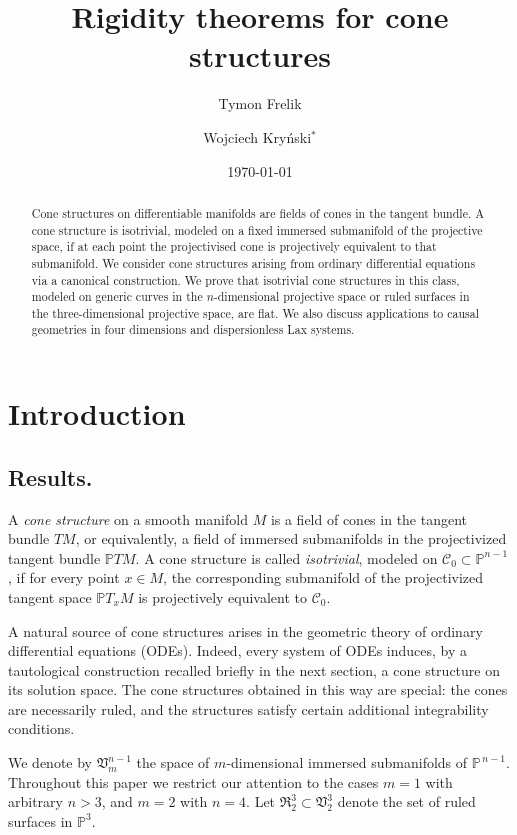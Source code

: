 \documentclass[11pt]{amsart}
\title{Rigidity theorems for cone structures}
\author[T.~Frelik]{Tymon Frelik}\address{Institute of Mathematics, Polish Academy of Sciences,  ul. \'Sniadeckich 8, 00-656 Warszawa, Poland}
\author[W.~Kry\'nski]{Wojciech Kry\'nski$^*$}
\theoremstyle{definition}
\newcommand{\PP}{\mathbb{P}}
\newcommand{\CC}{\mathcal{C}}
\begin{document}
\date{\today}
\maketitle


\begin{abstract}
Cone structures on differentiable manifolds are fields of cones in the tangent bundle. A cone structure is isotrivial, modeled on a fixed immersed submanifold of the projective space, if at each point the projectivised cone is projectively equivalent to that submanifold. We consider cone structures arising from ordinary differential equations via a canonical construction. We prove that isotrivial cone structures in this class, modeled on generic curves in the $n$-dimensional projective space or ruled surfaces in the three-dimensional projective space, are flat. We also discuss applications to causal geometries in four dimensions and dispersionless Lax systems.

\end{abstract}


\section{Introduction}


\subsection{Results.} A \emph{cone structure} on a smooth manifold $M$ is a field of cones in the tangent bundle $TM$, or equivalently, a field of immersed submanifolds in the projectivized tangent bundle $\PP TM$. A cone structure is called \emph{isotrivial}, modeled on $\CC_0 \subset \PP^{n-1}$, if for every point $x \in M$, the corresponding submanifold of the projectivized tangent space $\PP T_xM$ is projectively equivalent to $\CC_0$.

A natural source of cone structures arises in the geometric theory of ordinary differential equations (ODEs). Indeed, every system of ODEs induces, by a tautological construction recalled briefly in the next section, a cone structure on its solution space. The cone structures obtained in this way are special: the cones are necessarily ruled, and the structures satisfy certain additional integrability conditions.


We denote by $\mathfrak{V}_m^{n-1}$ the space of $m$-dimensional immersed submanifolds of $\PP^{\,n-1}$. Throughout this paper we restrict our attention to the cases $m=1$ with arbitrary $n>3$, and $m=2$ with $n=4.$ Let $\mathfrak{R}_2^3\subset\mathfrak{V}^3_2$ denote the set of ruled surfaces in $\PP^3$. 
\end{document}
